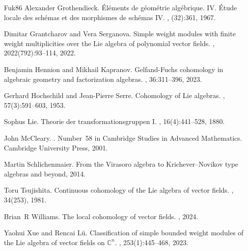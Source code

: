 \documentclass[12pt]{amsart}
\theoremstyle{definition}
\begin{document}
\begin{thebibliography}{{Fuk}86}
Alexander Grothendieck.
\newblock \'{E}l\'{e}ments de g\'{e}om\'{e}trie alg\'{e}brique. {IV}. \'{E}tude
  locale des sch\'{e}mas et des morphismes de sch\'{e}mas {IV}.
, (32):361, 1967.

Dimitar Grantcharov and Vera Serganova.
\newblock Simple weight modules with finite weight multiplicities over the
  {Lie} algebra of polynomial vector fields.
, 2022(792):93--114, 2022.

Benjamin Hennion and Mikhail Kapranov.
\newblock Gelfand-{Fuchs} cohomology in algebraic geometry and factorization
  algebras.
, 36:311--396, 2023.

Gerhard Hochschild and Jean-Pierre Serre.
\newblock Cohomology of {Lie} algebras.
, 57(3):591--603, 1953.

Sophus Lie.
\newblock Theorie der transformationsgruppen {I}.
, 16(4):441--528, 1880.

John McCleary.
.
\newblock Number~58 in Cambridge Studies in Advanced Mathematics. Cambridge
  University Press, 2001.

Martin Schlichenmaier.
\newblock From the {V}irasoro algebra to {K}richever--{N}ovikov type algebras
  and beyond, 2014.

Toru {Tsujishita}.
\newblock Continuous cohomology of the {L}ie algebra of vector fields.
, 34(253), 1981.

Brian~R Williams.
\newblock The local cohomology of vector fields.
, 2024.

Yaohui Xue and Rencai L{\"u}.
\newblock Classification of simple bounded weight modules of the {Lie} algebra
  of vector fields on $\mathbb{C}^n$.
, 253(1):445--468, 2023.

\end{thebibliography}
\end{document}
